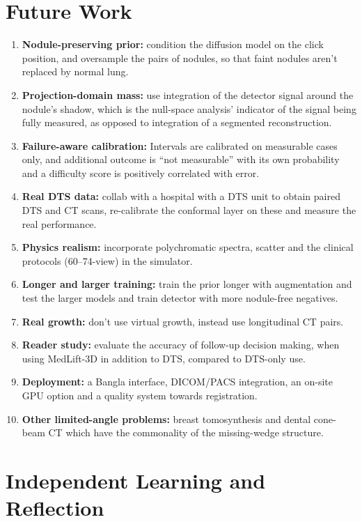 \section{Future Work}

\begin{enumerate}
  \item \textbf{Nodule-preserving prior:} condition the diffusion model on the click position, and oversample the pairs of nodules, so that faint nodules aren't replaced by normal lung.\item \textbf{Projection-domain mass:} use integration of the detector signal around the nodule's shadow, which is the null-space analysis' indicator of the signal being fully measured, as opposed to integration of a segmented reconstruction.\item \textbf{Failure-aware calibration:} Intervals are calibrated on measurable cases only, and additional outcome is ``not measurable'' with its own probability and a difficulty score is positively correlated with error.\item \textbf{Real DTS data:} collab with a hospital with a DTS unit to obtain paired DTS and CT scans, re-calibrate the conformal layer on these and measure the real performance.\item \textbf{Physics realism:} incorporate polychromatic spectra, scatter and the clinical protocols (60--74-view) in the simulator.\item \textbf{Longer and larger training:} train the prior longer with augmentation and test the larger models and train detector with more nodule-free negatives.\item \textbf{Real growth:} don't use virtual growth, instead use longitudinal CT pairs.\item \textbf{Reader study:} evaluate the accuracy of follow-up decision making, when using MedLift-3D in addition to DTS, compared to DTS-only use.\item \textbf{Deployment:} a Bangla interface, DICOM/PACS integration, an on-site GPU option and a quality system towards registration.\item \textbf{Other limited-angle problems:} breast tomosynthesis and dental cone-beam CT which have the commonality of the missing-wedge structure.
\end{enumerate}

\section{Independent Learning and Reflection}

